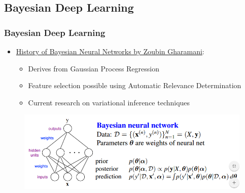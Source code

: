 \documentclass[11pt,
               hyperref={colorlinks,citecolor=pink,linkcolor=red,urlcolor=blue}
               ]{beamer}
\begin{document}
\begin{frame}
  \end{frame}

  \subsection{Bayesian Deep Learning}

  \begin{frame}
    \frametitle{Bayesian Deep Learning}

    \begin{itemize}
      \item \href{http://bayesiandeeplearning.org/slides/nips16bayesdeep.pdf}{History of Bayesian Neural Networks by Zoubin Gharamani\footnotemark[1]}:
        \begin{itemize}
          \item Derives from Gaussian Process Regression
          \item Feature selection possible using Automatic Relevance Determination
          \item Current research on variational inference techniques
        \end{itemize}
    \end{itemize}

    \begin{figure}
      \centering
      \includegraphics[width=\textwidth]{bnn1.png}
    \end{figure}

  \end{frame}
\end{document}
